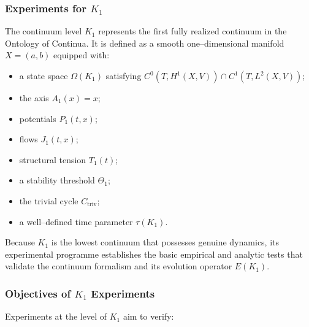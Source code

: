 
\subsubsection{Experiments for \texorpdfstring{$K_1$}{K_1}}
\label{sec:experiments-k1}

The continuum level $K_1$ represents the first fully realized continuum in
the Ontology of Continua.
It is defined as a smooth one–dimensional manifold $X = (a,b)$ equipped with:
\begin{itemize}
    \item a state space $\Omega(K_1)$ satisfying
          $C^0(T,H^1(X,V))\cap C^1(T,L^2(X,V))$;
    \item the axis $A_1(x)=x$;
    \item potentials $P_1(t,x)$;
    \item flows $J_1(t,x)$;
    \item structural tension $T_1(t)$;
    \item a stability threshold $\Theta_1$;
    \item the trivial cycle $C_{\mathrm{triv}}$;
    \item a well–defined time parameter $\tau(K_1)$.
\end{itemize}

Because $K_1$ is the lowest continuum that possesses genuine dynamics,
its experimental programme establishes the basic empirical and analytic
tests that validate the continuum formalism and its evolution operator
$E(K_1)$.


\subsubsection{Objectives of \texorpdfstring{$K_1$}{K_1} Experiments}

Experiments at the level of $K_1$ aim to verify:

